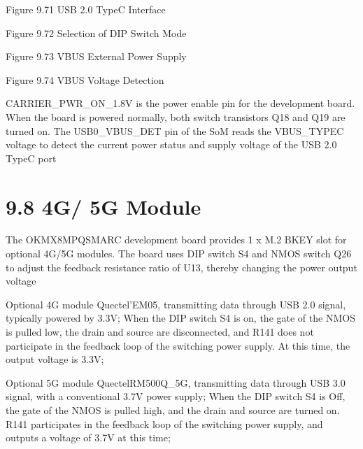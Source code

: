 \documentclass[letterpaper,10pt,openany,english]{sphinxmanual}
\begin{document}
\sphinxAtStartPar
{}

\sphinxAtStartPar
Figure 9.7\sphinxhyphen{}1 USB 2.0 Type\sphinxhyphen{}C Interface

\sphinxAtStartPar
{}

\sphinxAtStartPar
Figure 9.7\sphinxhyphen{}2 Selection of DIP Switch Mode

\sphinxAtStartPar
{}

\sphinxAtStartPar
Figure 9.7\sphinxhyphen{}3 VBUS External Power Supply

\sphinxAtStartPar
{}

\sphinxAtStartPar
Figure 9.7\sphinxhyphen{}4 VBUS Voltage Detection

\sphinxAtStartPar
CARRIER\_PWR\_ON\_1.8V is the power enable pin for the development board. When the board is powered normally, both switch transistors Q18 and Q19 are turned on. The USB0\_VBUS\_DET pin of the SoM reads the VBUS\_TYPEC voltage to detect the current power status and supply voltage of the USB 2.0 Type\sphinxhyphen{}C port


\section{9.8 4G/ 5G Module}
\label{\detokenize{hardware:g-5g-module}}
\sphinxAtStartPar
The OK\sphinxhyphen{}MX8MPQ\sphinxhyphen{}SMARC development board provides 1 x M.2 B\sphinxhyphen{}KEY slot for optional 4G/5G modules. The board uses DIP switch S4 and NMOS switch Q26 to adjust the feedback resistance ratio of U13, thereby changing the power output voltage

\sphinxAtStartPar
Optional 4G module Quectel’EM05, transmitting data through USB 2.0 signal, typically powered by 3.3V; When the DIP switch S4 is on, the gate of the NMOS is pulled low, the drain and source are disconnected, and R141 does not participate in the feedback loop of the switching power supply. At this time, the output voltage is 3.3V;

\sphinxAtStartPar
Optional 5G module Quectel\sphinxhyphen{}RM500Q\_5G, transmitting data through USB 3.0 signal, with a conventional 3.7V power supply; When the DIP switch S4 is Off, the gate of the NMOS is pulled high, and the drain and source are turned on. R141 participates in the feedback loop of the switching power supply, and outputs a voltage of 3.7V at this time;
\end{document}
